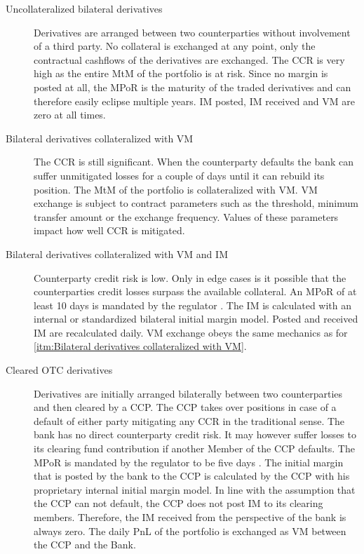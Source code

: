 \documentclass[../Thesis_AHoecherl.tex]{subfiles}
\begin{document}
\begin{description}
    \item[Uncollateralized bilateral derivatives\label{itm:Uncollateralized bilateral derivatives}] 
    Derivatives are arranged between two counterparties without involvement of a third party. No collateral is exchanged at any point, only the contractual cashflows of the derivatives are exchanged. The \gls{CCR} is very high as the entire \gls{MtM} of the portfolio is at risk. Since no margin is posted at all, the \gls{MPoR} is the maturity of the traded derivatives and can therefore easily eclipse multiple years. \gls{IM} posted, \gls{IM} received and \gls{VM} are zero at all times.
    \item[Bilateral derivatives collateralized with VM\label{itm:Bilateral derivatives collateralized with VM}] 
    The \gls{CCR} is still significant. When the counterparty defaults the bank can suffer unmitigated losses for a couple of days until it can rebuild its position. The \gls{MtM} of the portfolio is collateralized with \gls{VM}. \gls{VM} exchange is subject to contract parameters such as the threshold, minimum transfer amount or the exchange frequency. Values of these parameters impact how well \gls{CCR} is mitigated.
    \item[Bilateral derivatives collateralized with \gls{VM} and \gls{IM}\label{itm:Bilateral derivatives collateralized with VM and IM}] 
    Counterparty credit risk is low. Only in edge cases is it possible that the counterparties credit losses surpass the available collateral. An \gls{MPoR} of at least 10 days is mandated by the regulator . The IM is calculated with an internal or standardized bilateral initial margin model. Posted and received IM are recalculated daily. \gls{VM} exchange obeys the same mechanics as for \ref{itm:Bilateral derivatives collateralized with VM}.
    \item[Cleared OTC derivatives\label{itm:Cleared OTC derivatives}] 
    Derivatives are initially arranged bilaterally between two counterparties and then cleared by a CCP. The CCP takes over positions in case of a default of either party mitigating any \gls{CCR} in the traditional sense. The bank has no direct counterparty credit risk. It may however suffer losses to its clearing fund contribution if another Member of the CCP defaults. The \gls{MPoR} is mandated by the regulator to be five days . The initial margin that is posted by the bank to the \gls{CCP} is calculated by the \gls{CCP} with his proprietary internal initial margin model. In line with the assumption that the CCP can not default, the CCP does not post IM to its clearing members. Therefore, the IM received from the perspective of the bank is always zero. The daily \gls{PnL} of the portfolio is exchanged as VM between the CCP and the Bank. 

\end{description}
\end{document}
